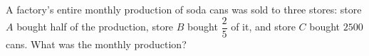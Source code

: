 A factory's entire monthly production of soda cans was sold to three stores: store $A$ bought half of the production, store $B$ bought $\dfrac25$ of it, and store $C$ bought $2500$ cans. What was the monthly production?
